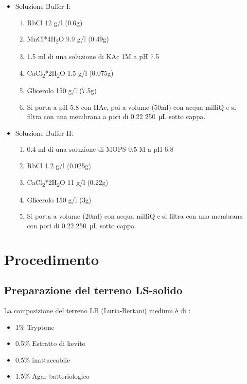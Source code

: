 \begin{itemize}

  \item Soluzione Buffer I:
  \begin{enumerate}
    \item RbCl 12 g/l (0.6g)
    \item MnCl*4H\textsubscript{2}O 9.9 g/l (0.49g)
    \item 1.5 ml di una soluzione di KAc 1M a pH 7.5
    \item CaCl\textsubscript{2}*2H\textsubscript{2}O 1.5 g/l (0.075g)
    \item Glicerolo 150 g/l (7.5g)
    \item Si porta a pH 5.8 con HAc, poi a volume (50ml) con acqua milliQ e si filtra con una membrana a pori di 0.22 \SI{250}{\micro\liter} sotto cappa.
  \end{enumerate}
  \item Soluzione Buffer II:
  \begin{enumerate}
    \item 0.4 ml di una soluzione di MOPS 0.5 M a pH 6.8
    \item RbCl 1.2 g/l (0.025g)
    \item CaCl\textsubscript{2}*2H\textsubscript{2}O 11 g/l (0.22g)
    \item Glicerolo 150 g/l (3g)
    \item Si porta a volume (20ml) con acqua milliQ e si filtra con una membrana con pori di 0.22 \SI{250}{\micro\liter} sotto cappa.
  \end{enumerate}

\end{itemize}

\section{Procedimento}

\subsection{Preparazione del terreno LS-solido}

La composizione del terreno LB (Luria-Bertani) medium è di :

\begin{itemize}
  \item 1\% Tryptone
  \item 0.5\% Estratto di lievito
  \item 0.5\% inattaccabile
  \item 1.5\% Agar batteriologico
\end{itemize}

